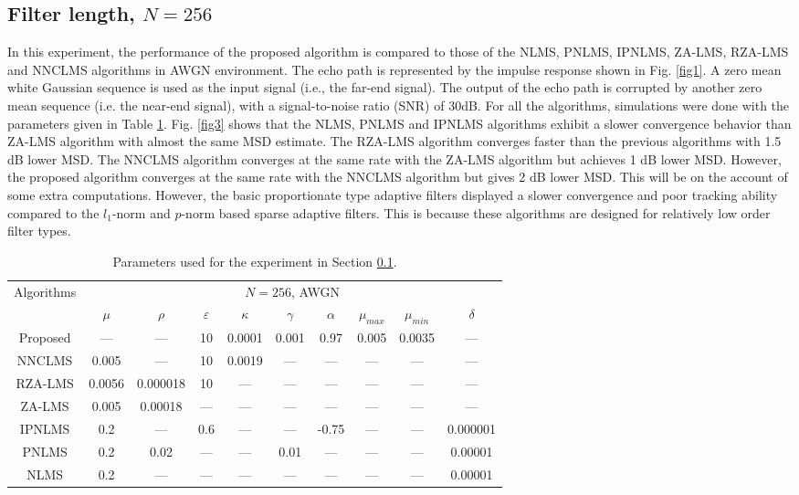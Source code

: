 \subsection{Filter length, $N=256$}\label{sec:5.2.1.1}
\vspace{-0.5cm}
\noindent In this experiment, the performance of the proposed algorithm is compared to those of the NLMS, PNLMS, IPNLMS, ZA-LMS, RZA-LMS and NNCLMS  algorithms in AWGN environment. The echo path is represented by the impulse response shown in Fig. \ref{fig1}. A zero mean white Gaussian sequence is used as the input signal (i.e., the far-end signal). The output of the echo path is corrupted by another zero mean sequence (i.e. the near-end signal), with a signal-to-noise ratio (SNR) of 30dB. For all the algorithms, simulations were done with the parameters given in Table \ref{table1}. Fig. \ref{fig3} shows that the NLMS, PNLMS and IPNLMS algorithms exhibit a slower convergence behavior than ZA-LMS algorithm with almost the same MSD estimate. The RZA-LMS algorithm converges faster than the previous algorithms with 1.5 dB lower MSD. The NNCLMS algorithm converges at the same rate with the ZA-LMS algorithm but achieves 1 dB lower MSD. However, the proposed algorithm converges at the same rate with the NNCLMS algorithm but gives 2 dB lower MSD. This will be on the account of some extra computations. However, the basic proportionate type adaptive filters displayed a slower convergence and poor tracking ability compared to the $l_1$-norm and $p$-norm  based sparse adaptive filters. This is because these algorithms are designed for relatively low order filter types.


\begin{table}[!htb]
\centering
\caption{Parameters used for the experiment in Section \ref{sec:5.2.1.1}.}
\vspace{0.5cm}
\begin{tabular}{|c|c|c|c|c|c|c|c|c|c|}
 \hline
    \multirow{2}{*}{Algorithms} & \multicolumn{9}{c|}{$N=256$, AWGN}\\
    \cline{2-10}
    & $\mu$ & $\rho$ & $\varepsilon$ & $\kappa$ & $\gamma$ &$\alpha$ &$\mu_{max}$& $\mu_{min}$ & $\delta$\\
    \hline
     Proposed  & ---  & --- & 10 & 0.0001 & 0.001& 0.97 & 0.005 & 0.0035 & --- \\ \hline
     NNCLMS  &0.005 & ---  & 10  & 0.0019 & --- & --- & ---  & --- & ---  \\ \hline
   RZA-LMS & 0.0056 &0.000018 & 10 & --- & ---  & --- & ---  & --- & --- \\ \hline
   ZA-LMS  & 0.005 & 0.00018 & --- & --- & --- & ---  & --- & --- & --- \\ \hline
   IPNLMS & 0.2 & --- & 0.6 & --- & --- & -0.75 & --- & --- & 0.000001 \\ \hline
   PNLMS & 0.2 & 0.02 & --- & --- & 0.01 & --- & --- & --- & 0.00001 \\ \hline
   NLMS & 0.2 & --- & --- & --- & --- & --- & --- & --- &  0.00001\\
   \hline
\end{tabular}
\label{table1}
\end{table}

